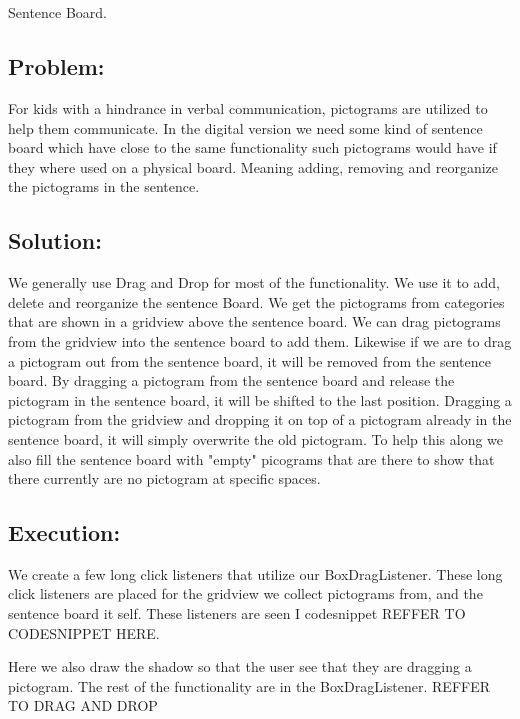 \section{} Sentence Board.
\subsection{Problem:}
For kids with a hindrance in verbal communication, pictograms are utilized to help them communicate. 
In the digital version we need some kind of sentence board which have close to the same functionality such pictograms would have if they where used on a physical board. 
Meaning adding, removing and reorganize the pictograms in the sentence.

\subsection{Solution:}
We generally use Drag and Drop for most of the functionality. 
We use it to add, delete and reorganize the sentence Board. 
We get the pictograms from categories that are shown in a gridview above the sentence board. 
We can drag pictograms from the gridview into the sentence board to add them. 
Likewise if we are to drag a pictogram out from the sentence board, it will be removed from the sentence board. 
By dragging a pictogram from the sentence board and release the pictogram in the sentence board, it will be shifted to the last position. 
Dragging a pictogram from the gridview and dropping it on top of a pictogram already in the sentence board, it will simply overwrite the old pictogram. 
To help this along we also fill the sentence board with "empty" picograms that are there to show that there currently are no pictogram at specific spaces.

\subsection{Execution:}
We create a few long click listeners that utilize our BoxDragListener. 
These long click listeners are placed for the gridview we collect pictograms from, and the sentence board it self. 
These listeners are seen I codesnippet REFFER TO CODESNIPPET HERE.


Here we also draw the shadow so that the user see that they are dragging a pictogram.
The rest of the functionality are in the BoxDragListener. REFFER TO DRAG AND DROP

